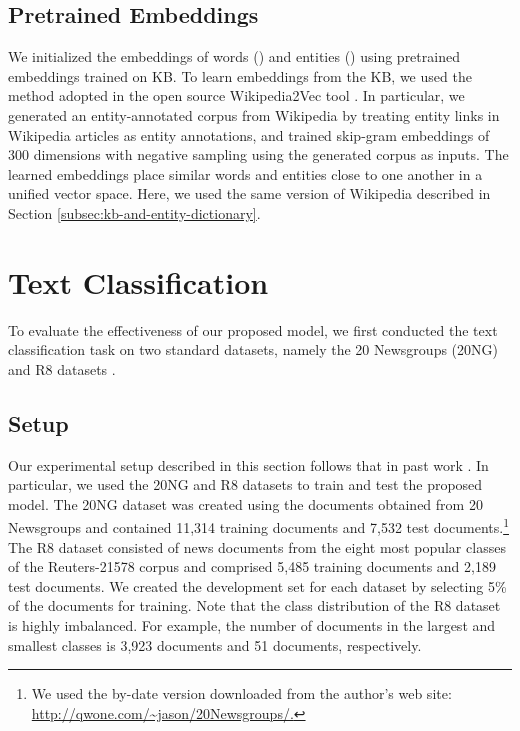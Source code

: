 \documentclass[11pt,a4paper]{article}
\begin{document}
    \subsection{Pretrained Embeddings}

    We initialized the embeddings of words () and entities () using pretrained embeddings trained on KB.
    To learn embeddings from the KB, we used the method adopted in the open source Wikipedia2Vec tool \cite{Yamada2016,Yamada2018}.
    In particular, we generated an entity-annotated corpus from Wikipedia by treating entity links in Wikipedia articles as entity annotations, and trained skip-gram embeddings \cite{Mikolov2013,Mikolov2013a} of 300 dimensions with negative sampling using the generated corpus as inputs.
    The learned embeddings place similar words and entities close to one another in a unified vector space.
    Here, we used the same version of Wikipedia described in Section \ref{subsec:kb-and-entity-dictionary}.

    \section{Text Classification}
    \label{sec:text-classification}

    To evaluate the effectiveness of our proposed model, we first conducted the text classification task on two standard datasets, namely the 20 Newsgroups (20NG) \cite{Lang1995} and R8 datasets \cite{Debole2005}.

    \subsection{Setup}
    \label{subsec:text-classification-setup}

    Our experimental setup described in this section follows that in past work \cite{Liu:2015:TWE:2886521.2886657,Jin2016,C18-1016}.
    In particular, we used the 20NG and R8 datasets to train and test the proposed model.
    The 20NG dataset was created using the documents obtained from 20 Newsgroups and contained 11,314 training documents and 7,532 test documents.\footnote{We used the by-date version downloaded from the author's web site: \url{http://qwone.com/~jason/20Newsgroups/.}}
    The R8 dataset consisted of news documents from the eight most popular classes of the Reuters-21578 corpus \cite{Lewis1992} and comprised 5,485 training documents and 2,189 test documents.
    We created the development set for each dataset by selecting 5\% of the documents for training.
    Note that the class distribution of the R8 dataset is highly imbalanced.
    For example, the number of documents in the largest and smallest classes is 3,923 documents and 51 documents, respectively.
\end{document}
